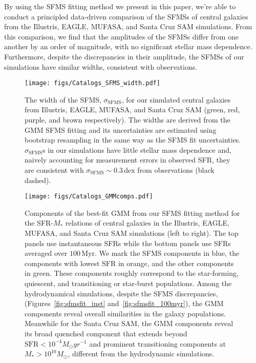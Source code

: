 \documentclass[preprint2,tighten]{aastex62}
\begin{document}
By using the SFMS fitting method we present in this paper, we're able to 
conduct a principled data-driven comparison of the SFMSs of central galaxies 
from the Illustris, EAGLE, MUFASA, and Santa Cruz SAM simulations. From 
this comparison, we find that the amplitudes of the SFMSs differ from one 
another by an order of magnitude, with no significant stellar mass dependence. 
Furthermore, despite the discrepancies in their amplitude, the SFMSs of 
our simulations have similar widths, consistent with observations. 
\begin{figure}
\begin{center}
\texttt{[image: figs/Catalogs\_SFMS\_width.pdf]}
\caption{The width of the SFMS, $\sigma_\mathrm{SFMS}$, for our simulated 
    central galaxies from Illustris, EAGLE, MUFASA, and Santa Cruz SAM 
    (green, red, purple, and brown respectively). The widths are derived from  
    the GMM SFMS fitting and its uncertainties are estimated using bootstrap
    resampling in the same way as the SFMS fit uncertainties. 
    $\sigma_\mathrm{SFMS}$s in our simulations have little stellar mass 
    dependence and, naively accounting for measurement errors in observed 
    SFR, they are consistent with $\sigma_\mathrm{SFMS}{\sim}0.3\,\mathrm{dex}$ 
    from observations (black dashed).} \label{fig:sfms_width}
\end{center}
\end{figure}


\begin{figure*}
\begin{center}
\texttt{[image: figs/Catalogs\_GMMcomps.pdf]} 
\caption{Components of the best-fit GMM from our SFMS fitting method for the
    SFR-$M_*$ relations of central galaxies in the Illustris, EAGLE, MUFASA, and 
    Santa Cruz SAM simulations (left to right). The top panels use instantaneous 
    SFRs while the bottom panels use SFRs averaged over $100\,\mathrm{Myr}$.  %
    We mark the SFMS components in blue, the components with lowest SFR in orange, 
    and the other components in green. These components roughly correspond to the 
    star-forming, quiescent, and transitioning or star-burst populations. 
    Among the hydrodynamical simulations, despite the SFMS discrepancies,
    (Figures~\ref{fig:sfmsfit_inst} and~\ref{fig:sfmsfit_100myr}), the GMM components 
    reveal overall similarities in the galaxy populations. Meanwhile for the Santa Cruz 
    SAM, the GMM components reveal its broad quenched component that extends beyond 
    $\mathrm{SFR} < 10^{-4}M_\odot yr^{-1}$ and prominent transitioning components at 
    $M_* > 10^{10}M_\odot$, different from the hydrodynamic simulations. 
    } \label{fig:sfmsfit_comps}
\end{center}
\end{figure*}
\end{document}
